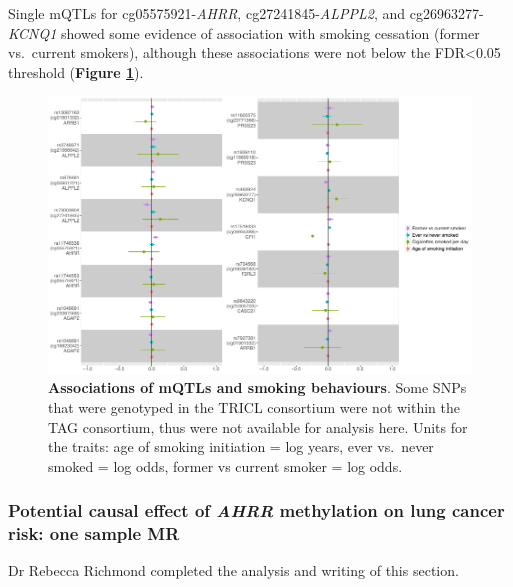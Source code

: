 \documentclass[11pt,oneside]{bristolthesis}
\begin{document}
Single mQTLs for cg05575921-\emph{AHRR}, cg27241845-\emph{ALPPL2}, and cg26963277-\emph{KCNQ1} showed some evidence of association with smoking cessation (former vs.~current smokers), although these associations were not below the FDR\textless0.05 threshold (\textbf{Figure \ref{fig:sup-fig4-07}}).




\begin{figure}

{\centering \includegraphics[width=1\linewidth]{figure/07-dnam_lungcancer_mr/sup_fig4-mqtl_smoking_mr} 

}

\caption[Associations of mQTLs and smoking behaviours]{\textbf{Associations of mQTLs and smoking behaviours}. Some SNPs that were genotyped in the TRICL consortium were not within the TAG consortium, thus were not available for analysis here. Units for the traits: age of smoking initiation = log years, ever vs.~never smoked = log odds, former vs current smoker = log odds.}\label{fig:sup-fig4-07}
\end{figure}
\hypertarget{ahrr-one-sample-mr}{%
\subsubsection{\texorpdfstring{Potential causal effect of \emph{AHRR} methylation on lung cancer risk: one sample MR}{Potential causal effect of AHRR methylation on lung cancer risk: one sample MR}}\label{ahrr-one-sample-mr}}

Dr Rebecca Richmond completed the analysis and writing of this section.
\end{document}
